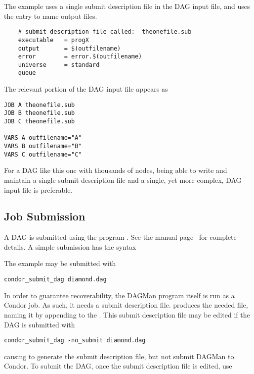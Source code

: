 The example uses a single submit description file in the DAG input
file, and uses the  entry to name output files.

\footnotesize
\begin{verbatim}
    # submit description file called:  theonefile.sub
    executable   = progX
    output       = $(outfilename)
    error        = error.$(outfilename)
    universe     = standard
    queue
\end{verbatim}
\normalsize

The relevant portion of the DAG input file appears as 
\begin{verbatim}
JOB A theonefile.sub
JOB B theonefile.sub
JOB C theonefile.sub

VARS A outfilename="A"
VARS B outfilename="B"
VARS C outfilename="C"
\end{verbatim}

For a DAG like this one with thousands of nodes,
being able to write and maintain a single submit description file 
and a single, yet more complex, DAG input file is preferable.

\subsection{\label{dagman:submitdag}Job Submission}

A DAG is submitted using the program .
See the manual
page~\pageref{man-condor-submit}
for complete details.
A simple submission has the syntax

 

The example may be submitted with

\begin{verbatim}
condor_submit_dag diamond.dag
\end{verbatim}
In order to guarantee recoverability, the DAGMan program itself
is run as a Condor job.
As such, it needs a submit description file.
 produces the needed file,
naming it by appending  to the .
This submit description file may be edited if the DAG is
submitted with

\begin{verbatim}
condor_submit_dag -no_submit diamond.dag
\end{verbatim}
causing  to generate the submit description file,
but not submit DAGMan to Condor.
To submit the DAG, once the submit description file is edited,
use

